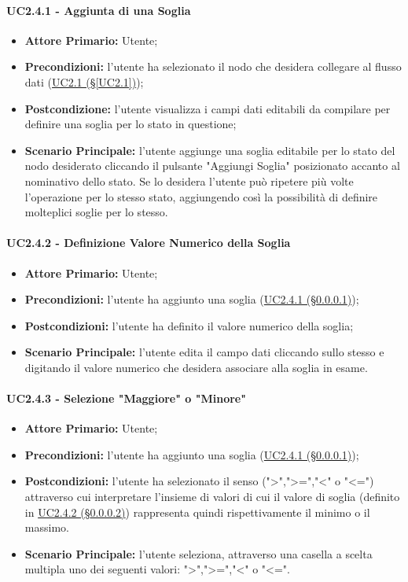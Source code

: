 \paragraph{UC2.4.1 - Aggiunta di una Soglia}\label{UC2.4.1}
\begin{itemize}
	\item \textbf{Attore Primario:} Utente;
	\item \textbf{Precondizioni:} l'utente ha selezionato il nodo che desidera collegare al flusso dati 					(\hyperref[UC2.1]{UC2.1 (§\ref*{UC2.1})});
	\item \textbf{Postcondizione:} l'utente visualizza i campi dati editabili da compilare per definire una soglia per lo stato in questione;
	\item \textbf{Scenario Principale:} l'utente aggiunge una soglia editabile per lo stato del nodo desiderato cliccando il pulsante "Aggiungi Soglia" posizionato accanto al nominativo dello stato. Se lo desidera l'utente può ripetere più volte l'operazione per lo stesso stato, aggiungendo così la possibilità di definire molteplici soglie per lo stesso.
\end{itemize}

\paragraph{UC2.4.2 - Definizione Valore Numerico della Soglia}\label{UC2.4.2}
\begin{itemize}
	\item \textbf{Attore Primario:} Utente;
	\item \textbf{Precondizioni:} l'utente ha aggiunto una soglia (\hyperref[UC2.4.1]{UC2.4.1 (§\ref*{UC2.4.1})});
	\item \textbf{Postcondizioni:} l'utente ha definito il valore numerico della soglia;
	\item \textbf{Scenario Principale:} l'utente edita il campo dati cliccando sullo stesso e digitando il valore numerico che desidera associare alla soglia in esame.
\end{itemize}

\paragraph{UC2.4.3 - Selezione "Maggiore" o "Minore"}\label{UC2.4.3}
\begin{itemize}
	\item \textbf{Attore Primario:} Utente;
	\item \textbf{Precondizioni:} l'utente ha aggiunto una soglia (\hyperref[UC2.4.1]{UC2.4.1 (§\ref*{UC2.4.1})});
	\item \textbf{Postcondizioni:} l'utente ha selezionato il senso (">",">=","<" o "<=") attraverso cui interpretare l'insieme di valori di cui il valore di soglia (definito in \hyperref[UC2.4.2]{UC2.4.2 (§\ref*{UC2.4.2})}) rappresenta quindi rispettivamente il minimo o il massimo.
	\item \textbf{Scenario Principale:} l'utente seleziona, attraverso una casella a scelta multipla uno dei seguenti valori: ">",">=","<" o "<=".
\end{itemize}

